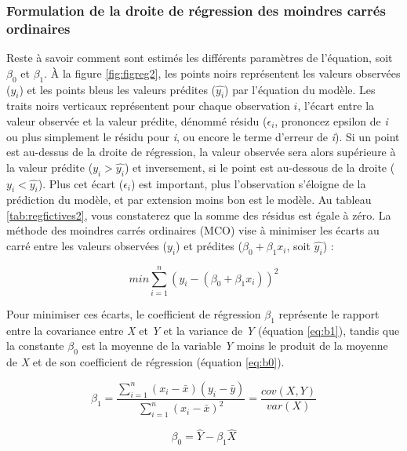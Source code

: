 \documentclass[
  11pt,
  french,
]{book}
\begin{document}
\hypertarget{sect04142}{%
\subsubsection{Formulation de la droite de régression des moindres carrés ordinaires}\label{sect04142}}

Reste à savoir comment sont estimés les différents paramètres de l'équation, soit \(\beta_0\) et \(\beta_1\). À la figure \ref{fig:figreg2}, les points noirs représentent les valeurs observées (\(y_i\)) et les points bleus les valeurs prédites (\(\widehat{y_i}\)) par l'équation du modèle. Les traits noirs verticaux représentent pour chaque observation \(i\), l'écart entre la valeur observée et la valeur prédite, dénommé résidu (\(\epsilon_i\), prononcez epsilon de \emph{i} ou plus simplement le résidu pour \emph{i}, ou encore le terme d'erreur de \emph{i}). Si un point est au-dessus de la droite de régression, la valeur observée sera alors supérieure à la valeur prédite (\(y_i > \widehat{y_i}\)) et inversement, si le point est au-dessous de la droite (\(y_i < \widehat{y_i}\)). Plus cet écart (\(\epsilon_i\)) est important, plus l'observation s'éloigne de la prédiction du modèle, et par extension moins bon est le modèle. Au tableau \ref{tab:regfictives2}, vous constaterez que la somme des résidus est égale à zéro. La méthode des moindres carrés ordinaires (MCO) vise à minimiser les écarts au carré entre les valeurs observées (\(y_i\)) et prédites (\(\beta_0+\beta_1 x_i\), soit \(\widehat{y_i}\)) :

\begin{equation} 
min\sum_{i=1}^n{(y_i-(\beta_0+\beta_1 x_i))^2}
\label{eq:mco}
\end{equation}

Pour minimiser ces écarts, le coefficient de régression \(\beta_1\) représente le rapport entre la covariance entre \emph{X} et \emph{Y} et la variance de \emph{Y} (équation \eqref{eq:b1}), tandis que la constante \(\beta_0\) est la moyenne de la variable \emph{Y} moins le produit de la moyenne de \emph{X} et de son coefficient de régression (équation \eqref{eq:b0}).

\begin{equation} 
\beta_1 = \frac{\sum_{i=1}^n (x_{i}-\bar{x})(y_{i}-\bar{y})}{\sum_{i=1}^n (x_i-\bar{x})^2} = \frac{cov(X,Y)}{var(X)}
\label{eq:b1}
\end{equation}

\begin{equation} 
\beta_0 = \widehat{Y}-\beta_1 \widehat{X}
\label{eq:b0}
\end{equation}
\end{document}
